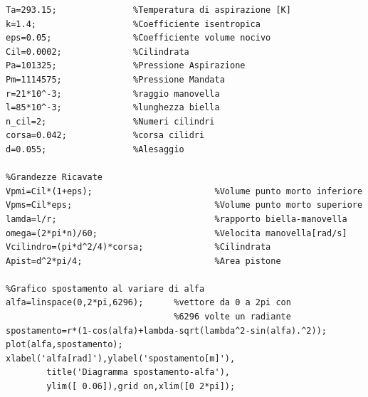 \begin{lstlisting}[frame=trBL]
%Dati
Ta=293.15;               %Temperatura di aspirazione [K]
k=1.4;                   %Coefficiente isentropica
eps=0.05;                %Coefficiente volume nocivo
Cil=0.0002;              %Cilindrata
Pa=101325;               %Pressione Aspirazione
Pm=1114575;              %Pressione Mandata
r=21*10^-3;              %raggio manovella
l=85*10^-3;              %lunghezza biella
n_cil=2;                 %Numeri cilindri
corsa=0.042;             %corsa cilidri
d=0.055;                 %Alesaggio

%Grandezze Ricavate
Vpmi=Cil*(1+eps);                        %Volume punto morto inferiore
Vpms=Cil*eps;                            %Volume punto morto superiore
lamda=l/r;                               %rapporto biella-manovella
omega=(2*pi*n)/60;                       %Velocita manovella[rad/s]
Vcilindro=(pi*d^2/4)*corsa;              %Cilindrata
Apist=d^2*pi/4;                          %Area pistone

%Grafico spostamento al variare di alfa
alfa=linspace(0,2*pi,6296);      %vettore da 0 a 2pi con 
                                 %6296 volte un radiante
spostamento=r*(1-cos(alfa)+lambda-sqrt(lambda^2-sin(alfa).^2));
plot(alfa,spostamento);
xlabel('alfa[rad]'),ylabel('spostamento[m]'),
        title('Diagramma spostamento-alfa'),
        ylim([ 0.06]),grid on,xlim([0 2*pi]);
\end{lstlisting}
